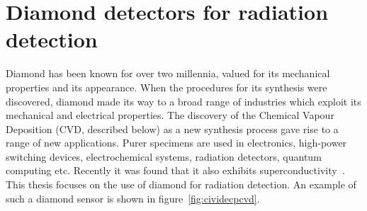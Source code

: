 
\chapter{Diamond detectors for radiation detection}
\label{ch:diamond}

%
%

Diamond has been known for over two millennia, valued for its mechanical properties and its appearance. When the procedures for its synthesis were discovered, diamond made its way to a broad range of industries which exploit its mechanical and electrical properties. The discovery of the Chemical Vapour Deposition (CVD, described below) as a new synthesis process gave rise to a range of new applications. Purer specimens are used in electronics, high-power switching devices, electrochemical systems, radiation detectors, quantum computing etc. Recently it was found that it also exhibits superconductivity~\cite{DIAMS:00000}. This thesis focuses on the use of diamond for radiation detection. An example of such a diamond sensor is shown in figure~\ref{fig:cividecpcvd}.

